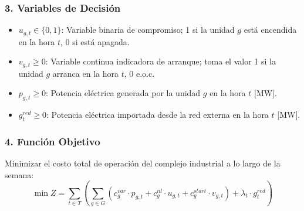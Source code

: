 \documentclass[10pt,letterpaper]{article}
\begin{document}
\subsubsection*{3. Variables de Decisión}
\begin{itemize}
    \item $u_{g,t} \in \{0, 1\}$: Variable binaria de compromiso; 1 si la unidad $g$ está encendida en la hora $t$, 0 si está apagada.
    \item $v_{g,t} \ge 0$: Variable continua indicadora de arranque; toma el valor 1 si la unidad $g$ arranca en la hora $t$, 0 e.o.c.
    \item $p_{g,t} \ge 0$: Potencia eléctrica generada por la unidad $g$ en la hora $t$ [MW].
    \item $g_t^{red} \ge 0$: Potencia eléctrica importada desde la red externa en la hora $t$ [MW].
\end{itemize}

\subsubsection*{4. Función Objetivo}
Minimizar el costo total de operación del complejo industrial a lo largo de la semana:
\begin{equation}
    \min Z = \sum_{t \in T} \left( \sum_{g \in G} \left( c_g^{var} \cdot p_{g,t} + c_g^{nl} \cdot u_{g,t} + c_g^{start} \cdot v_{g,t} \right) + \lambda_t \cdot g_t^{red} \right)
    \label{eq:fo_base}
\end{equation}
\end{document}
